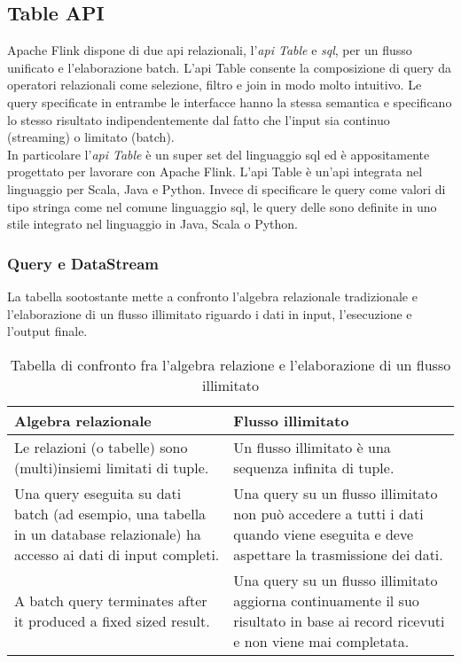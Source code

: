 \subsection{Table API}
Apache Flink dispone di due \gls{api} relazionali, l'\textit{\gls{api} Table} e \textit{\gls{sql}}, per un flusso unificato e l'elaborazione batch. L'\gls{api} Table consente la composizione di query da operatori relazionali come selezione, filtro e join in modo molto intuitivo. Le query specificate in entrambe le interfacce hanno la stessa semantica e specificano lo stesso risultato indipendentemente dal fatto che l'input sia continuo (streaming) o limitato (batch).\\
In particolare l'\textit{\gls{api} Table} è un super set del linguaggio \gls{sql} ed è appositamente progettato per lavorare con Apache Flink. L'\gls{api} Table è un'\gls{api} integrata nel linguaggio per Scala, Java e Python. Invece di specificare le query come valori di tipo stringa come nel comune linguaggio \gls{sql}, le query delle  sono definite in uno stile integrato nel linguaggio in Java, Scala o Python.

\subsubsection{Query e DataStream}
La tabella sootostante mette a confronto l'algebra relazionale tradizionale e l'elaborazione di un flusso illimitato riguardo i dati in input, l'esecuzione e l'output finale.

\begin{table}[hbt!]
\caption{Tabella di confronto fra l'algebra relazione e l'elaborazione di un flusso illimitato}
\label{tab:algebraRelazionale-flussoIllimitato}
\begin{tabularx}{\textwidth}{XX}
\hline
\textbf{Algebra relazionale} & \textbf{Flusso illimitato}\\
\hline
Le relazioni (o tabelle) sono (multi)insiemi limitati di tuple.     & Un flusso illimitato è una sequenza infinita di tuple. \\
\hline
Una query eseguita su dati batch (ad esempio, una tabella in un database relazionale) ha accesso ai dati di input completi.    & Una query su un flusso illimitato non può accedere a tutti i dati quando viene eseguita e deve aspettare la trasmissione dei dati. \\
\hline
A batch query terminates after it produced a fixed sized result.     & Una query su un flusso illimitato aggiorna continuamente il suo risultato in base ai record ricevuti e non viene mai completata. \\
\hline
\end{tabularx}
\end{table}%

